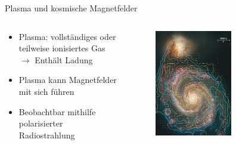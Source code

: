   \begin{frame}{Plasma und kosmische Magnetfelder}
    \begin{columns}
   \begin{column}{0.5\textwidth}
    \begin{itemize}
      \setlength\itemsep{2em}
      \item  Plasma: vollständiges oder teilweise ionisiertes Gas\\[1.5em]
            $\longrightarrow$ Enthält Ladung
      \item  Plasma kann Magnetfelder mit sich führen
      \item  Beobachtbar mithilfe polarisierter Radiostrahlung
    \end{itemize}
  \vspace{2em}
  \end{column}
  \begin{column}{0.5\textwidth}
  \begin{figure}
    \centering
    \includegraphics[width=0.6\textwidth]{images/magnetfelder.png}
  \end{figure}
  \end{column}
    \end{columns}
  \end{frame}

